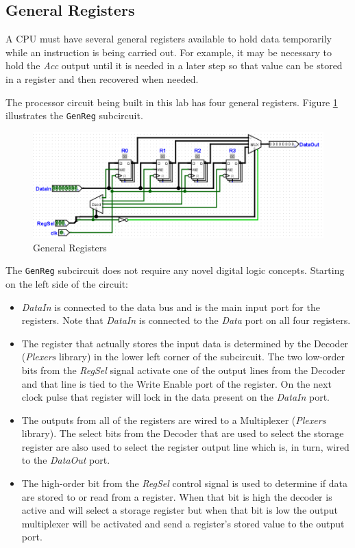 \subsection{General Registers}

A \ac{CPU} must have several general registers available to hold data temporarily while an instruction is being carried out. For example, it may be necessary to hold the \textit{Acc} output until it is needed in a later step so that value can be stored in a register and then recovered when needed. 

The processor circuit being built in this lab has four general registers. Figure \ref{fig:proc-04} illustrates the \lstinline[columns=fixed]|GenReg| subcircuit.

\begin{figure}[H]
	\centering
	\includegraphics[width=\maxwidth{.95\linewidth}]{gfx/proc-04}
	\caption{General Registers}
	\label{fig:proc-04}
\end{figure}

The \lstinline[columns=fixed]|GenReg| subcircuit does not require any novel digital logic concepts. Starting on the left side of the circuit:

\begin{itemize}
	\item \textit{DataIn} is connected to the data bus and is the main input port for the registers. Note that \textit{DataIn} is connected to the \textit{Data} port on all four registers. 
	\item The register that actually stores the input data is determined by the Decoder (\textit{Plexers} library) in the lower left corner of the subcircuit. The two low-order bits from the \textit{RegSel} signal activate one of the output lines from the Decoder and that line is tied to the Write Enable port of the register. On the next clock pulse that register will lock in the data present on the \textit{DataIn} port.
	\item The outputs from all of the registers are wired to a Multiplexer (\textit{Plexers} library). The select bits from the Decoder that are used to select the storage register are also used to select the register output line which is, in turn, wired to the \textit{DataOut} port.
	\item The high-order bit from the \textit{RegSel} control signal is used to determine if data are stored to or read from a register. When that bit is high the decoder is active and will select a storage register but when that bit is low the output multiplexer will be activated and send a register's stored value to the output port.
\end{itemize}

